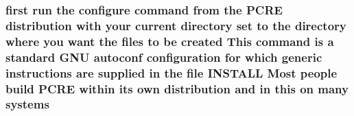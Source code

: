 \subsubsection[{\texorpdfstring{systems}{systems}}]{ {\bf first} {\bf run} the {\bf configure} {\bf command} {\bf from} the {\bf P\+C\+RE} distribution {\bf with} your {\bf current} {\bf directory} {\bf set} {\bf to} the {\bf directory} {\bf where} you want the {\bf files} {\bf to} {\bf be} created This {\bf command} {\bf is} {\bf a} standard G\+NU autoconf configuration for {\bf which} generic {\bf instructions} {\bf are} supplied {\bf in} the {\bf file} I\+N\+S\+T\+A\+LL Most people build {\bf P\+C\+RE} within its own distribution and {\bf in} {\bf this} {\bf on} many systems}\hypertarget{README_8txt_a5369fa606c139884659617709eab157b}{}\label{README_8txt_a5369fa606c139884659617709eab157b}
